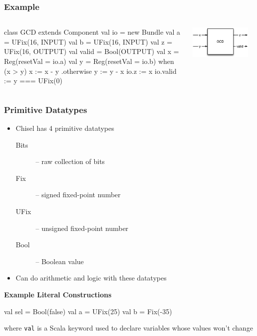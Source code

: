 \documentclass[xcolor=pdflatex,dvipsnames,table]{beamer}
\begin{document}
\begin{frame}[fragile]
\frametitle{Example}
\begin{columns}


\begin{footnotesize}
\begin{scala}
class GCD extends Component {
  val io = new Bundle {
    val a     = UFix(16, INPUT)
    val b     = UFix(16, INPUT)
    val z     = UFix(16, OUTPUT)
    val valid = Bool(OUTPUT) }
  val x = Reg(resetVal = io.a)
  val y = Reg(resetVal = io.b)
  when (x > y) {
    x := x - y
  } .otherwise {
    y := y - x
  }
  io.z     := x
  io.valid := y === UFix(0)
}
\end{scala}
\end{footnotesize}


\begin{center}
\includegraphics[width=0.9\textwidth]{figs/gcd.pdf} 
\end{center}

\end{columns}
\end{frame}

\begin{frame}[fragile]
\frametitle{Primitive Datatypes}
\begin{itemize}
\item{Chisel has 4 primitive datatypes}
\begin{description}
\item[Bits]  -- raw collection of bits
\item[Fix]   -- signed fixed-point number
\item[UFix] -- unsigned fixed-point number
\item[Bool] -- Boolean value
\end{description}
\item Can do arithmetic and logic with these datatypes
\end{itemize}

\textbf{Example Literal Constructions}
\begin{scala}
val sel = Bool(false)
val a   = UFix(25)
val b   = Fix(-35)
\end{scala}
where \verb+val+ is a Scala keyword used to declare variables whose values won't change
\end{frame}
\end{document}
